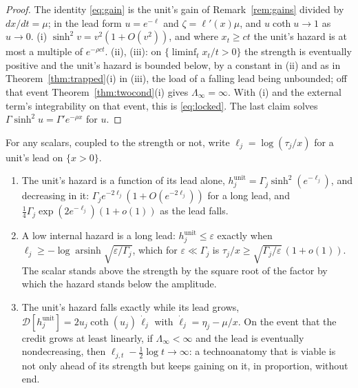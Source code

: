 \begin{proof}
The identity \eqref{eq:gain} is the unit's gain of
Remark~\ref{rem:gains} divided by $dx/dt=\mu$; in the lead form
$u=e^{-\ell}$ and $\zeta=\ell'(x)\mu$, and $u\coth u\to1$ as $u\to0$. (i)
$\sinh^2v=v^2(1+O(v^2))$, and where $x_t\ge ct$ the unit's hazard is at
most a multiple of $e^{-\rho ct}$. (ii), (iii): on
$\{\liminf_tx_t/t>0\}$ the strength is eventually positive and the unit's
hazard is bounded below, by a constant in (ii) and as in
Theorem~\ref{thm:trapped}(i) in (iii), the load of a falling lead being
unbounded; off that event Theorem~\ref{thm:twocond}(i) gives
$\Lambda_\infty=\infty$. With (i) and the external term's integrability
on that event, this is \eqref{eq:locked}. The last claim solves
$\Gamma\sinh^2u=\Gamma'e^{-\rho x}$ for $u$.
\end{proof}

\begin{proposition}\label{prop:leadcoord}
For any scalars, coupled to the strength or not, write
$\ell_j=\log(\tau_j/x)$ for a unit's lead on $\{x>0\}$.
\begin{enumerate}[label=\emph{(\roman*)},itemsep=1pt]
\item The unit's hazard is a function of its lead alone,
$h^{\mathrm{unit}}_j=\Gamma_j\sinh^2(e^{-\ell_j})$, and decreasing in it:
$\Gamma_je^{-2\ell_j}(1+O(e^{-2\ell_j}))$ for a long lead, and
$\tfrac14\Gamma_j\exp(2e^{-\ell_j})(1+o(1))$ as the lead falls.
\item A low internal hazard is a long lead: $h^{\mathrm{unit}}_j\le\varepsilon$
exactly when $\ell_j\ge-\log\operatorname{arsinh}\sqrt{\varepsilon/\Gamma_j}$,
which for $\varepsilon\ll\Gamma_j$ is
$\tau_j/x\ge\sqrt{\Gamma_j/\varepsilon}\,(1+o(1))$. The scalar stands above
the strength by the square root of the factor by which the hazard stands
below the amplitude.
\item The unit's hazard falls exactly while its lead grows,
$\mathcal D[h^{\mathrm{unit}}_j]=2u_j\coth(u_j)\,\dot\ell_j$ with
$\dot\ell_j=\eta_j-\mu/x$. On the event that the credit grows at least
linearly, if $\Lambda_\infty<\infty$ and the lead is eventually
nondecreasing, then $\ell_{j,t}-\tfrac12\log t\to\infty$: a technoanatomy
that is viable is not only ahead of its strength but keeps gaining on it,
in proportion, without end.
\end{enumerate}
\end{proposition}

